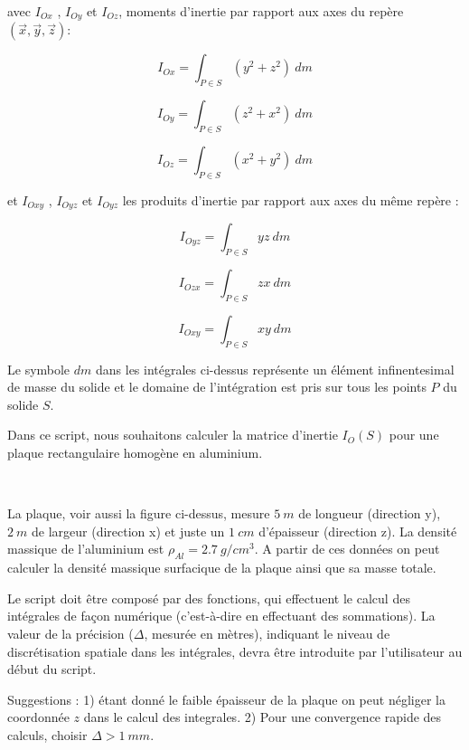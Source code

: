 \documentclass{article}
\begin{document}
    avec \(I_{Ox}\) , \(I_{Oy}\) et \(I_{Oz}\), moments d'inertie par
rapport aux axes du repère \((\vec{x},\vec{y},\vec{z})\):

    \[I_{Ox} = \int_{P\in S} (y^2+z^2)\ dm\]

\[I_{Oy} = \int_{P\in S} (z^2+x^2)\ dm\]

\[I_{Oz} = \int_{P\in S} (x^2+y^2)\ dm\]

    et \(I_{Oxy}\) , \(I_{Oyz}\) et \(I_{Oyz}\) les produits d'inertie par
rapport aux axes du même repère :

    \[I_{Oyz} = \int_{P\in S} yz \ dm\]

\[I_{Ozx} = \int_{P\in S} zx \ dm\]

\[I_{Oxy} = \int_{P\in S} xy \ dm\]

    Le symbole \(dm\) dans les intégrales ci-dessus représente un élément
infinentesimal de masse du solide et le domaine de l'intégration est
pris sur tous les points \(P\) du solide \(S\).

    Dans ce script, nous souhaitons calculer la matrice d'inertie
\(I_{O}(S)\) pour une plaque rectangulaire homogène en aluminium.

    \begin{center}
    \end{center}
    { \hspace*{\fill} \\}
    

    La plaque, voir aussi la figure ci-dessus, mesure \(5\ m\) de longueur
(direction y), \(2\ m\) de largeur (direction x) et juste un \(1 \ cm\)
d'épaisseur (direction z). La densité massique de l'aluminium est
\(\rho_{Al} = 2.7 \ g / cm^{3}\). A partir de ces données on peut
calculer la densité massique surfacique de la plaque ainsi que sa masse
totale.

Le script doit être composé par des fonctions, qui effectuent le calcul
des intégrales de façon numérique (c'est-à-dire en effectuant des
sommations). La valeur de la précision (\(\Delta\), mesurée en mètres),
indiquant le niveau de discrétisation spatiale dans les intégrales,
devra être introduite par l'utilisateur au début du script.

Suggestions : 1) étant donné le faible épaisseur de la plaque on peut
négliger la coordonnée \(z\) dans le calcul des integrales. 2) Pour une
convergence rapide des calculs, choisir \(\Delta > 1\ mm\).
\end{document}
